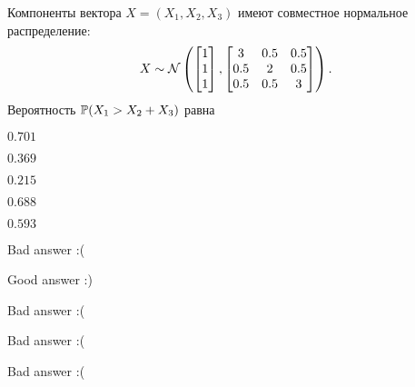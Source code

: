 
\begin{question}
Компоненты вектора \(X=(X_{1},X_{2},X_{3})\) имеют совместное нормальное
распределение: \[
X\sim\cN \left(
\begin{bmatrix}1\\1\\1\end{bmatrix},
\begin{bmatrix}3 & 0.5 & 0.5\\0.5 & 2 & 0.5\\0.5 & 0.5 & 3\end{bmatrix}
\right).
\] Вероятность \(\P(X_{1}>X_{2}+X_{3} )\) равна
\begin{answerlist}
  \item \(0.701\)
  \item \(0.369\)
  \item \(0.215\)
  \item \(0.688\)
  \item \(0.593\)
\end{answerlist}
\end{question}

\begin{solution}
\begin{answerlist}
  \item Bad answer :(
  \item Good answer :)
  \item Bad answer :(
  \item Bad answer :(
  \item Bad answer :(
\end{answerlist}
\end{solution}


